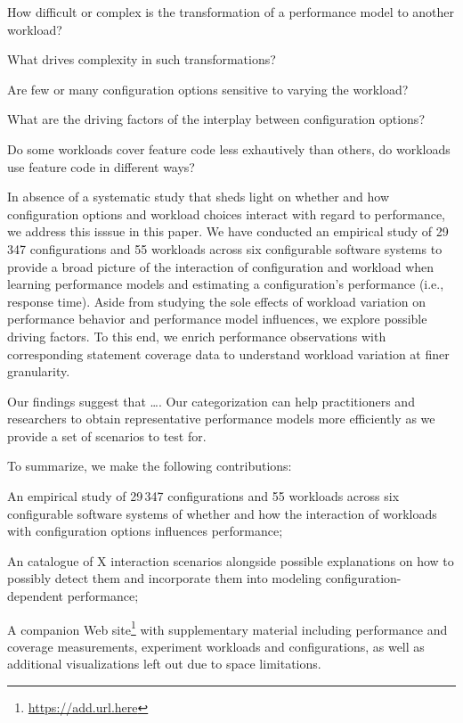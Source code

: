 \begin{compactitem}
	\item How difficult or complex is the transformation of a performance model to another workload? 
	\item What drives complexity in such transformations? 
	\item Are few or many configuration options sensitive to varying the workload?
	\item What are the driving factors of the interplay between configuration options? 
	\item Do some workloads cover feature code less exhautively than others, do workloads use feature code in different ways?
\end{compactitem}

In absence of a systematic study that sheds light on whether and how configuration options and workload choices interact with regard to performance, we address this isssue in this paper. 
We have conducted an empirical study of 29\,347 configurations and 55 workloads across six configurable software systems to provide a broad picture of the interaction of configuration and workload when learning performance models and estimating a configuration's performance (i.e., response time). Aside from studying the sole effects of workload variation on performance behavior and performance model influences, we explore possible driving factors. To this end, we enrich performance observations with corresponding statement coverage data to understand workload variation at finer granularity.

Our findings suggest that {\color{red} \ldots. Our categorization can help practitioners and researchers to obtain representative performance models more efficiently as we provide a set of scenarios to test for.}

To summarize, we make the following contributions: 

\begin{compactitem}
	\item An empirical study of 29\,347 configurations and 55 workloads across six configurable software systems of whether and how the interaction of workloads with configuration options influences performance;
	
	\item {An catalogue of \color{red}X interaction scenarios alongside possible explanations on how to possibly detect them and incorporate them into modeling configuration-dependent performance;}
	
	\item A companion Web site\footnote{\url{https://add.url.here}} with supplementary material including performance and coverage measurements, experiment workloads and configurations, as well as additional visualizations left out due to space limitations.
\end{compactitem}


